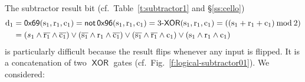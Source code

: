\documentclass[12pt,notitlepage]{article}
\newcommand{\NOT}{\ensuremath{\mathop{\mathsf{not}}}\xspace}
\newcommand{\XOR}{\ensuremath{\mathop{\mathsf{XOR}}}\xspace}
\begin{document}
The subtractor result bit
(cf.~Table~\ref{t:subtractor1} and \S\ref{ss:cello})
\begin{subequations}
	\begin{align} 
		\label{e:3xor}
		\ce{d_1} 
		& = 
		\mathop{\mathsf{0x69}}
		(\ce{s_1}, \ce{r_1}, \ce{c_1})
		=
		\NOT
		\mathop{\mathsf{0x96}}
		(\ce{s_1}, \ce{r_1}, \ce{c_1})
		=
		\text{3-\XOR}
		(\ce{s_1}, \ce{r_1}, \ce{c_1})
		=
		((\ce{s_1} + \ce{r_1} + \ce{c_1}) \mathbin{\mathrm{mod}} 2)
		\\
		\label{e:3xor-dnf}
		& =
		(s_1 \wedge \ce{\overline{r_1}} \wedge \ce{\overline{c_1}})
		\vee
		(\ce{\overline{s_1}} \wedge \ce{r_1} \wedge \ce{\overline{c_1}})
		\vee
		(\ce{\overline{s_1}} \wedge \ce{\overline{r_1}} \wedge \ce{c_1})
		\vee
		(\ce{s_1} \wedge \ce{r_1} \wedge \ce{c_1})
	\end{align}
\end{subequations}
is particularly difficult
because the result flips 
whenever any input is flipped.
%
%
It is a concatenation
of two \XOR gates (cf.~Fig.~\ref{f:logical-subtractor01}).
%
%
%
We considered:
%
\end{document}

